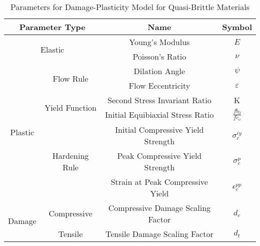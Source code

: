 \begin{table}[]
\centering
\caption{Parameters for Damage-Plasticity Model for Quasi-Brittle Materials}
\label{tab:concParam}
\begin{tabular}{@{}cccc@{}}
\toprule
\multicolumn{2}{c}{Parameter Type}                         & Name                               & Symbol              \\ \midrule
\multicolumn{2}{c}{\multirow{2}{*}{Elastic}}               & Young's Modulus                    & $E$                 \\
\multicolumn{2}{c}{}                                       & Poisson's Ratio                    & $\nu$               \\ \cmidrule(r){1-2}
\multirow{7}{*}{Plastic} & \multirow{2}{*}{Flow Rule}      & Dilation Angle                     & $\psi$              \\
                         &                                 & Flow Eccentricity                  & $\varepsilon$       \\ \cmidrule(lr){2-2}
                         & \multirow{2}{*}{Yield Function} & Second Stress Invariant Ratio      & K                   \\
                         &                                 & Initial Equibiaxial Stress Ratio   & $\frac{fb_0}{fc_o}$ \\ \cmidrule(lr){2-2}
                         & \multirow{3}{*}{Hardening Rule} & Initial Compressive Yield Strength & $\sigma_c^{iy}$     \\
                         &                                 & Peak Compressive Yield Strength    & $\sigma_c^{p}$      \\
                         &                                 & Strain at Peak Compressive Yield   & $\epsilon_c^{pp}$   \\ \cmidrule(r){1-2}
\multirow{2}{*}{Damage}  & Compressive                     & Compressive Damage Scaling Factor  & $d_c$               \\ \cmidrule(lr){2-2}
                         & Tensile                         & Tensile Damage Scaling Factor      & $d_t$               \\ \bottomrule
\end{tabular}
\end{table}
